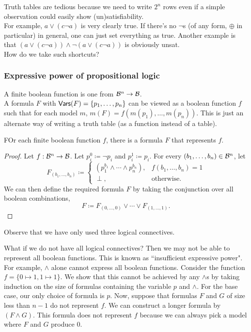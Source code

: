 Truth tables are tedious because we need to write $2^n$ rows even if a simple observation could easily show (un)satisfiability.\\
For example, $a \vee (c \neg a)$ is very clearly true. If there's no $\neg$s (of any form, $\oplus$ in particular) in general, one can just set everything as true. Another example is that $(a \vee (c \neg a))\wedge\neg (a \vee (c \neg a))$ is obviously unsat.\\
How do we take such shortcuts?

\subsubsection{Expressive power of propositional logic}

A finite boolean function is one from $\mathcal{B}^n\to\mathcal{B}$.\\
A formula $F$ with $\mathsf{Vars}(F)=\{p_1,\ldots,p_n\}$ can be viewed as a boolean function $f$ such that for each model $m$, $m(F)=f(m(p_1),\ldots,m(p_n))$. This is just an alternate way of writing a truth table (as a function instead of a table).

\begin{theorem}
FOr each finite boolean function $f$, there is a formula $F$ that represents $f$.
\end{theorem}
\begin{proof}
Let $f:\mathcal{B}^n\to\mathcal{B}$. Let $p_i^0\coloneqq\neg p_i$ and $p_i^1\coloneqq p_i$. For every $(b_1,\ldots,b_n)\in\mathcal{B}^n$, let
\[
    F_{(b_1,\ldots,b_n)} \coloneqq
    \begin{cases}
        (p_1^{b_1}\wedge\cdots\wedge p_n^{b_n}), & f(b_1,\ldots,b_n)=1 \\
        \perp, & \text{otherwise.}
    \end{cases}
\]
We can then define the required formula $F$ by taking the conjunction over all boolean combinations,
\[ F \coloneqq F_{(0,\ldots,0)} \vee \cdots \vee F_{(1,\ldots,1)}. \]
\end{proof}

Observe that we have only used three logical connectives.

What if we do not have all logical connectives? Then we may not be able to represent all boolean functions. This is known as ``insufficient expressive power".\\

For example, $\wedge$ alone cannot express all boolean functions. Consider the function $f=\{0\mapsto 1, 1\mapsto 1\}$. We show that this cannot be achieved by any $\wedge$s by taking induction on the size of formulas containing the variable $p$ and $\wedge$. For the base case, our only choice of formula is $p$. Now, suppose that formulas $F$ and $G$ of size less than $n-1$ do not represent $f$. We can construct a longer formula by $(F\wedge G)$. This formula does not represent $f$ because we can always pick a model where $F$ and $G$ produce $0$.

